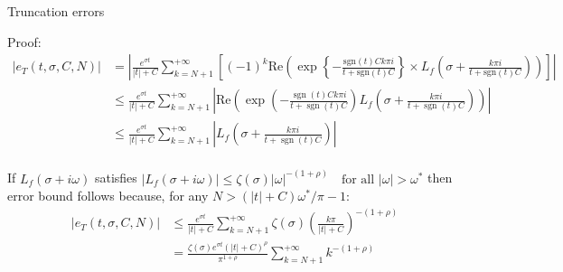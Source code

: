 \documentclass{beamer}
\begin{document}
\begin{frame}{Truncation errors}


    {\footnotesize \scriptsize
    \par Proof:
    \begin{align*}
        |e_T(t, \sigma, C, N)|&= \left|\frac{e^{\sigma t}}{|t| + C} 
       \sum_{k=N+1}^{+\infty} \left[ (-1)^k \text{Re} \left( \exp \left\{ -\frac{\text{sgn}(t)C k \pi i}{t + \text{sgn}(t)C} \right\} 
       \times L_f \left( \sigma + \frac{k \pi i}{t + \text{sgn}(t)C} \right) \right) \right]\right|\\
       & \leq \frac{e^{\sigma t}}{|t| + C} \sum_{k=N+1}^{+\infty} \left| 
        \text{Re}\left( \exp\left(-\frac{\operatorname{sgn}(t)Ck\pi i}{t + \operatorname{sgn}(t)C}\right)
        L_f\left(\sigma + \frac{k\pi i}{t + \operatorname{sgn}(t)C}\right)\right)\right|\\
        &\leq \frac{e^{\sigma t}}{|t| + C} \sum_{k=N+1}^{+\infty} \left| L_f\left(\sigma + \frac{k\pi i}{t + \operatorname{sgn}(t)C}\right)\right|\\
    \end{align*}
    \par \pause  If \( L_f(\sigma + i\omega) \) satisfies $|L_f(\sigma + i\omega)| \leq \zeta(\sigma)|\omega|^{-(1+\rho)} \quad \text{for all } |\omega| > \omega^*$ 
    then error bound follows because, for any \( N > (|t| + C)\omega^*/\pi - 1 \):
    \begin{align*}
        |e_T(t, \sigma, C, N)| &\leq \frac{e^{\sigma t}}{|t| + C} \sum_{k=N+1}^{+\infty} \zeta(\sigma) \left(\frac{k\pi}{|t| + C}\right)^{-(1+\rho)}\\
        &= \frac{\zeta(\sigma)e^{\sigma t}(|t| + C)^{\rho}}{\pi^{1+\rho}} \sum_{k=N+1}^{+\infty} k^{-(1+\rho)}\\
    \end{align*}
    }
    
\end{frame}
\end{document}
